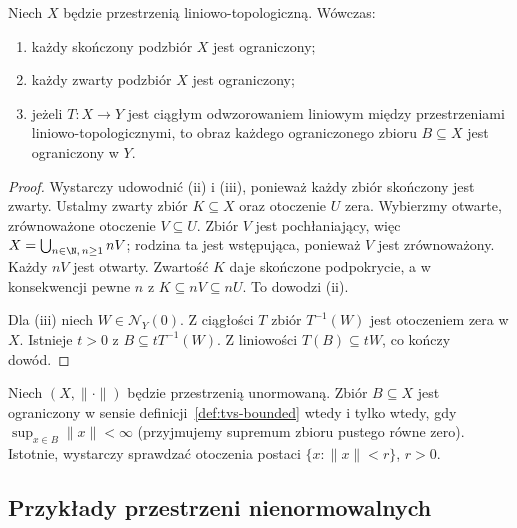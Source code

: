 \begin{twierdzenie}\label{thm:compact-bounded}
Niech $X$ będzie przestrzenią liniowo-topologiczną.
Wówczas:
\begin{enumerate}[label=\textup{(\roman*)}]
 \item każdy skończony podzbiór $X$ jest ograniczony;
 \item każdy zwarty podzbiór $X$ jest ograniczony;
 \item jeżeli $T\colon X\to Y$ jest ciągłym odwzorowaniem liniowym
       między przestrzeniami liniowo-topologicznymi, to obraz
       każdego ograniczonego zbioru $B\subseteq X$ jest ograniczony w $Y$.
\end{enumerate}
\end{twierdzenie}
\begin{proof}
Wystarczy udowodnić (ii) i (iii), ponieważ każdy zbiór
skończony jest zwarty. Ustalmy zwarty zbiór $K\subseteq X$
oraz otoczenie $U$ zera. Wybierzmy otwarte, zrównoważone
otoczenie $V\subseteq U$. Zbiór $V$ jest pochłaniający,
więc $X=\bigcup_{n\in\N,\,n\geq1}nV$; rodzina ta jest
wstępująca, ponieważ $V$ jest zrównoważony. Każdy $nV$
jest otwarty. Zwartość $K$ daje skończone podpokrycie,
a w konsekwencji pewne $n$ z $K\subseteq nV\subseteq nU$.
To dowodzi (ii).

Dla (iii) niech $W\in\mathcal N_Y(0)$.
Z ciągłości $T$ zbiór $T^{-1}(W)$ jest otoczeniem zera w $X$.
Istnieje $t>0$ z $B\subseteq tT^{-1}(W)$.
Z liniowości $T(B)\subseteq tW$, co kończy dowód.
\end{proof}

\begin{przyklad}
Niech $(X,\|\cdot\|)$ będzie przestrzenią unormowaną.
Zbiór $B\subseteq X$ jest ograniczony w sensie
definicji~\ref{def:tvs-bounded} wtedy i tylko wtedy, gdy
$\sup_{x\in B}\|x\|<\infty$ (przyjmujemy supremum zbioru
pustego równe zero). Istotnie, wystarczy sprawdzać
otoczenia postaci $\{x:\|x\|<r\}$, $r>0$.
\end{przyklad}

\subsection{Przykłady przestrzeni nienormowalnych}

